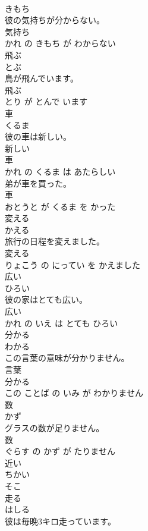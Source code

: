 \documentclass[8pt]{extreport}
\begin{document}
\begin{CJK}{UTF8}{min}
\\	きもち			
\\	彼の気持ちが分からない。	
\\	気持ち 
\\	かれ の きもち が わからない			
\\	飛ぶ	
\\	とぶ			
\\	鳥が飛んでいます。	
\\	飛ぶ 
\\	とり が とんで います			
\\	車	
\\	くるま			
\\	彼の車は新しい。	
\\	新しい 
\\	車 
\\	かれ の くるま は あたらしい			
\\	弟が車を買った。	
\\	車 
\\	おとうと が くるま を かった			
\\	変える	
\\	かえる			
\\	旅行の日程を変えました。	
\\	変える 
\\	りょこう の にってい を かえました			
\\	広い	
\\	ひろい			
\\	彼の家はとても広い。	
\\	広い 
\\	かれ の いえ は とても ひろい			
\\	分かる	
\\	わかる			
\\	この言葉の意味が分かりません。	
\\	言葉 
\\	分かる 
\\	この ことば の いみ が わかりません			
\\	数	
\\	かず			
\\	グラスの数が足りません。	
\\	数 
\\	ぐらす の かず が たりません			
\\	近い	
\\	ちかい			
\\	そこ	
\\	走る	
\\	はしる			
\\	彼は毎晩3キロ走っています。	

\end{CJK}
\end{document}
